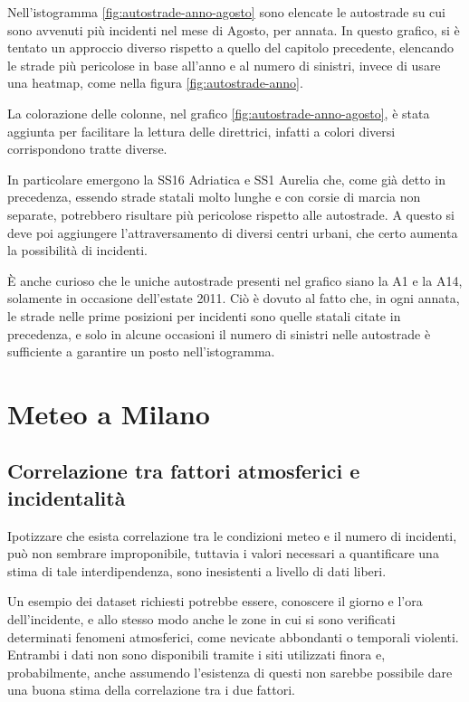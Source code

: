\documentclass[a4paper,12pt]{report}
\begin{document}
Nell'istogramma \ref{fig:autostrade-anno-agosto} sono elencate le 
autostrade su cui sono avvenuti più incidenti nel mese di Agosto, per annata. 
In questo grafico, si è tentato un approccio diverso rispetto a quello del capitolo precedente, 
elencando le strade più pericolose in base all'anno e al numero di sinistri, invece di usare una 
heatmap, come nella figura \ref{fig:autostrade-anno}. 

La colorazione delle colonne, nel grafico \ref{fig:autostrade-anno-agosto}, è stata aggiunta per 
facilitare la lettura delle direttrici, infatti a colori diversi corrispondono tratte diverse. 

In particolare emergono la SS16 Adriatica e SS1 Aurelia che, come già 
detto in precedenza, essendo strade statali molto lunghe e con corsie di marcia 
non separate, potrebbero risultare più pericolose rispetto alle autostrade. 
A questo si deve poi aggiungere l'attraversamento di diversi centri urbani, 
che certo aumenta la possibilità di incidenti. 

\`E anche curioso che le uniche autostrade presenti nel grafico siano la A1 e la A14, 
solamente in occasione dell'estate 2011. 
Ciò è dovuto al fatto che, in ogni annata, le strade nelle prime posizioni per incidenti sono 
quelle statali citate in precedenza, e solo in alcune occasioni il numero di sinistri 
nelle autostrade è sufficiente a garantire un posto nell'istogramma. 


\section{Meteo a Milano}

\subsection{Correlazione tra fattori atmosferici e incidentalità}

Ipotizzare che esista correlazione tra le condizioni meteo e il numero di incidenti, 
può non sembrare improponibile, tuttavia i valori necessari a quantificare una stima
di tale interdipendenza, sono inesistenti a livello di dati liberi.

Un esempio dei dataset richiesti potrebbe essere, conoscere il giorno e l'ora 
dell'incidente, e allo stesso modo anche le zone in cui si sono verificati determinati 
fenomeni atmosferici, come nevicate abbondanti o temporali violenti. 
Entrambi i dati non sono disponibili tramite i siti utilizzati finora e, 
probabilmente, anche assumendo l'esistenza di questi non sarebbe possibile dare una 
buona stima della correlazione tra i due fattori. 
\end{document}
